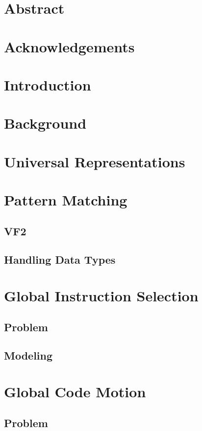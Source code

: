 \documentclass{kthdiss}
\begin{document}
\chapter{Abstract}
\chapter{Acknowledgements}

\tableofcontents

\chapter{Introduction}

\chapter{Background}

\chapter{Universal Representations}

\chapter{Pattern Matching}
\section{VF2}
\section{Handling Data Types}

\chapter{Global Instruction Selection}
\section{Problem}
\section{Modeling}

\chapter{Global Code Motion}
\section{Problem}
\end{document}
